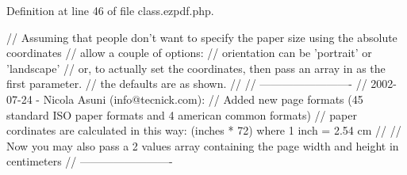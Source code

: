 \-Definition at line 46 of file class.\-ezpdf.\-php.


\begin{DoxyCode}
                                                    {
        // Assuming that people don't want to specify the paper size using the
       absolute coordinates
        // allow a couple of options:
        // orientation can be 'portrait' or 'landscape'
        // or, to actually set the coordinates, then pass an array in as the
       first parameter.
        // the defaults are as shown.
        // 
        // -------------------------
        // 2002-07-24 - Nicola Asuni (info@tecnick.com):
        // Added new page formats (45 standard ISO paper formats and 4 american
       common formats)
        // paper cordinates are calculated in this way: (inches * 72) where 1
       inch = 2.54 cm
        // 
        // Now you may also pass a 2 values array containing the page width and
       height in centimeters
        // -------------------------

}
\end{DoxyCode}
